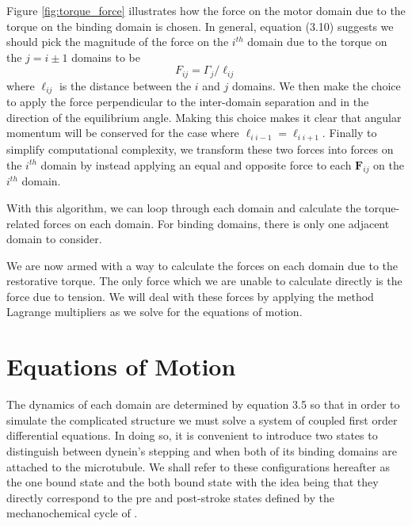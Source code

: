 	Figure \ref{fig:torque_force} illustrates how the force on the motor domain due to the torque on the binding domain is chosen. In general, equation (3.10) suggests we should pick the magnitude of the force on the $i^{th}$ domain due to the torque on the $j=i\pm1$ domains to be
	\begin{equation}
		F_{ij} = \Gamma_j / \ell_{ij}
	\end{equation}
	where $\ell_{ij}$ is the distance between the $i$ and $j$ domains. We then make the choice to apply the force perpendicular to the inter-domain separation and in the direction of the equilibrium angle. Making this choice makes it clear that angular momentum will be conserved for the case where $\ell_{i\;i-1}=\ell_{i\;i+1}$. Finally to simplify computational complexity, we transform these two forces into forces on the $i^{th}$ domain by instead applying an equal and opposite force to each $\mathbf{F}_{ij}$ on the $i^{th}$ domain. 
	
	With this algorithm, we can loop through each domain and calculate the torque-related forces on each domain. For binding domains, there is only one adjacent domain to consider. 
	
	We are now armed with a way to calculate the forces on each domain due to the restorative torque. The only force which we are unable to calculate directly is the force due to tension. We will deal with these forces by applying the method Lagrange multipliers as we solve for the equations of motion. 
	
	\section{Equations of Motion}
	The dynamics of each domain are determined by equation 3.5 so that in order to simulate the complicated structure we must solve a system of coupled first order differential equations. In doing so, it is convenient to introduce two states to distinguish between dynein's stepping and when both of its binding domains are attached to the microtubule. We shall refer to these configurations hereafter as the one bound state and the both bound state with the idea being that they directly correspond to the pre and post-stroke states defined by the mechanochemical cycle of \cite{cianfrocco_mechanism_2015}.  
	
